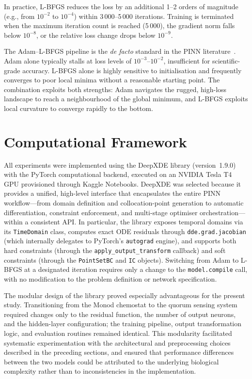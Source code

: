 \documentclass[14pt,a4paper,openany]{extbook}
\begin{document}
In practice, L-BFGS reduces the loss by an additional 1--2 orders of
magnitude (e.g., from $10^{-2}$ to $10^{-4}$) within
3\,000--5\,000 iterations.  Training is terminated when the maximum
iteration count is reached (5\,000), the gradient norm falls below
$10^{-8}$, or the relative loss change drops below $10^{-9}$.

The Adam--L-BFGS pipeline is the \emph{de facto} standard in the PINN
literature~\cite{raissi2019, lu2021deepxde, wang2021understanding}.  Adam
alone typically stalls at loss levels of $10^{-3}$--$10^{-2}$, insufficient
for scientific-grade accuracy.  L-BFGS alone is highly sensitive to
initialisation and frequently converges to poor local minima without a
reasonable starting point.  The combination exploits both strengths: Adam
navigates the rugged, high-loss landscape to reach a neighbourhood of the
global minimum, and L-BFGS exploits local curvature to converge rapidly to
the bottom.

\section{Computational Framework}
\label{sec:framework}

All experiments were implemented using the DeepXDE library
(version~1.9.0)~\cite{lu2021deepxde} with the PyTorch computational
backend, executed on an NVIDIA Tesla T4 GPU provisioned through Kaggle
Notebooks.  DeepXDE was selected because it provides a unified,
high-level interface that encapsulates the entire PINN workflow---from
domain definition and collocation-point generation to automatic
differentiation, constraint enforcement, and multi-stage optimiser
orchestration---within a consistent API.  In particular, the library
exposes temporal domains via its \texttt{TimeDomain} class, computes
exact ODE residuals through \texttt{dde.grad.jacobian} (which internally
delegates to PyTorch's \texttt{autograd} engine), and supports both hard
constraints (through the \texttt{apply\_output\_transform} callback) and
soft constraints (through the \texttt{PointSetBC} and \texttt{IC}
objects).  Switching from Adam to L-BFGS at a designated iteration
requires only a change to the \texttt{model.compile} call, with no
modification to the problem definition or network specification.

The modular design of the library proved especially advantageous for the
present study.  Transitioning from the Monod chemostat to the quorum
sensing system required changes only to the residual function, the number
of output neurons, and the hidden-layer configuration; the training
pipeline, output transformation logic, and evaluation routines remained
identical.  This modularity facilitated systematic experimentation with
the architectural and preprocessing choices described in the preceding
sections, and ensured that performance differences between the two
models could be attributed to the underlying biological complexity
rather than to inconsistencies in the implementation.
\end{document}
